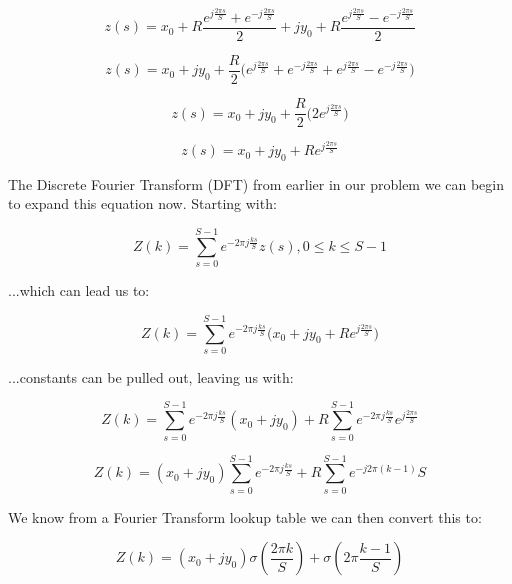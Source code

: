 \documentclass{article}
\begin{document}
\begin{equation}
    z(s)= x_0 + R\frac{e^{j\frac{2\pi s}{S}} + e^{-j\frac{2\pi s}{S}}}{2} + jy_0 + R\frac{e^{j\frac{2\pi s}{S}}-e^{-j\frac{2\pi s}{S}}}{2}
\end{equation}

\begin{equation}
    z(s) = x_0 + jy_0 + \frac{R}{2} \bigl(e^{j\frac{2\pi s}{S}} + e^{-j\frac{2\pi s}{S}} + e^{j\frac{2\pi s}{S}} - e^{-j\frac{2\pi s}{S}}\bigr)
\end{equation}

\begin{equation}
    z(s)= x_0 + jy_0 + \frac{R}{2} \bigl( 2e^{j\frac{2\pi s}{S}} \bigr)
\end{equation}

\begin{equation}
    z(s)= x_0 + jy_0 + Re^{j\frac{2\pi s}{S}}
\end{equation}

\noindent The Discrete Fourier Transform (DFT) from earlier in our problem we can begin to expand this equation now. Starting with:

\begin{equation}
    Z(k) = \sum^{S-1}_{s=0} e^{-2\pi j \frac{ks}{S}} z(s), 0\leq k \leq S-1
\end{equation}

\noindent ...which can lead us to:

\begin{equation}
    Z(k) = \sum^{S-1}_{s=0} e^{-2\pi j \frac{ks}{S}} \bigl( x_0 + jy_0 + Re^{j\frac{2\pi s}{S}} \bigr)
\end{equation}

\noindent ...constants can be pulled out, leaving us with:

\begin{equation}
    Z(k) = \sum^{S-1}_{s=0} e^{-2\pi j \frac{ks}{S}} (x_0 + jy_0) + R\sum^{S-1}_{s=0} e^{-2\pi j \frac{ks}{S}} e^{j\frac{2\pi s}{S}}
\end{equation}

\begin{equation}
    Z(k) = (x_0 + jy_0) \sum^{S-1}_{s=0} e^{-2\pi j \frac{ks}{S}}  + R\sum^{S-1}_{s=0} e^{-j 2 \pi (k-1)} S
\end{equation}

\noindent We know from a Fourier Transform lookup table we can then convert this to:

\begin{equation}
    Z(k) = (x_0+jy_0)\sigma(\frac{2\pi k}{S}) + \sigma(2\pi \frac{k-1}{S})
\end{equation}
\end{document}
